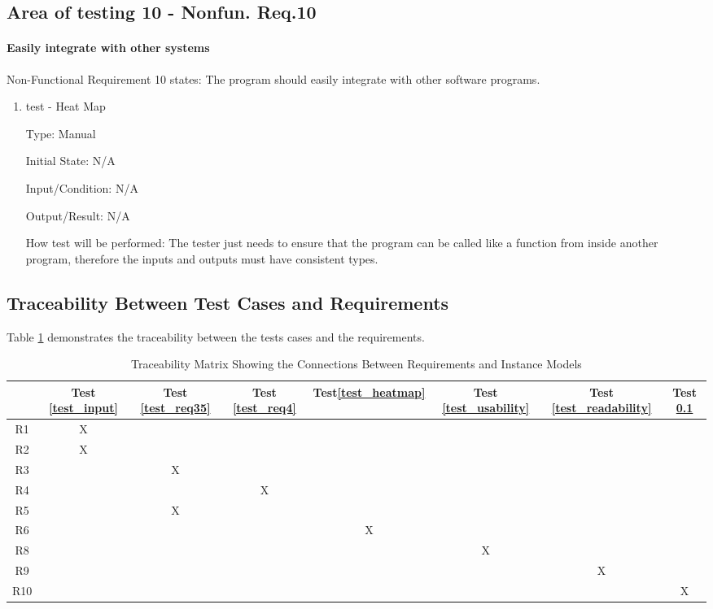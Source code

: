 \documentclass[12pt, titlepage]{article}
\begin{document}
\subsection{Area of testing 10 - Nonfun. Req.10} \label{test_system}
\paragraph{Easily integrate with other systems}

Non-Functional Requirement 10 states: The program should easily integrate with other software programs. 

\begin{enumerate}

\item{test - Heat Map\\}

Type: Manual
					
Initial State: N/A 
					
Input/Condition: N/A
					
Output/Result: N/A
					
How test will be performed: The tester just needs to ensure that the program can be called like a function from inside another program, therefore the inputs and outputs must have consistent types.
					
\end{enumerate}


\subsection{Traceability Between Test Cases and Requirements}
Table \ref{Table:R_trace} demonstrates the traceability between the tests cases and the requirements. 


\begin{table}[h!]
\centering
\begin{tabular}{|c|c|c|c|c|c|c|c|}
\hline
	& Test \ref{test_input} & Test \ref{test_req35} & Test \ref{test_req4} & Test\ref{test_heatmap}  & Test \ref{test_usability}  & Test \ref{test_readability}  & Test \ref{test_system}\\
\hline
R1      &X& & & & & & \\ \hline
R2 		&X& & & & & & \\ \hline
R3		& &X& & & & & \\ \hline
R4      & & &X& & & & \\ \hline 
R5		& &X& & & & &  \\ \hline
R6		& & & &X& & &  \\ \hline
R8		& & & & &X& &  \\ \hline
R9		& & & & & &X&  \\ \hline
R10 		& & & & & & &X \\ 
\hline
\end{tabular}
\caption{Traceability Matrix Showing the Connections Between Requirements and Instance Models}
\label{Table:R_trace}
\end{table}
\end{document}
